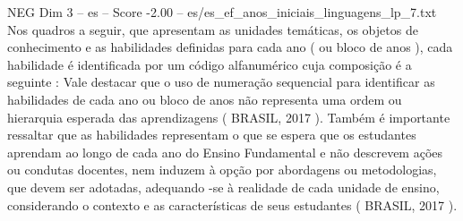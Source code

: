 \begin{textsample}{NEG Dim 3 – es – Score -2.00 – es/es\_ef\_anos\_iniciais\_linguagens\_lp\_7.txt}
Nos quadros a seguir, que apresentam as unidades temáticas, os objetos de conhecimento e as habilidades definidas para cada ano ( ou bloco de anos ), cada habilidade é identificada por um código alfanumérico cuja composição é a seguinte : Vale destacar que o uso de numeração sequencial para identificar as habilidades de cada ano ou bloco de anos não representa uma ordem ou hierarquia esperada das aprendizagens ( BRASIL, 2017 ).
Também é importante ressaltar que as habilidades representam o que se espera que os estudantes aprendam ao longo de cada ano do Ensino Fundamental e não descrevem ações ou condutas docentes, nem induzem à opção por abordagens ou metodologias, que devem ser adotadas, adequando -se à realidade de cada unidade de ensino, considerando o contexto e as características de seus estudantes ( BRASIL, 2017 ).

\end{textsample}
